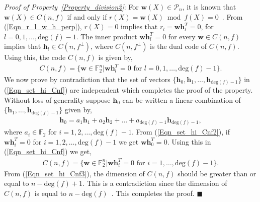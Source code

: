 \documentclass[10pt,journal]{IEEEtran}
\def \deg{{\mathrm{deg}}}
\begin{document}
\textit{Proof of Property~\ref{Property_division2}}:
%  
% 
For $\mathbf{w}(X) \in \mathcal{P}_n$, it is known that $\mathbf{w}(X) \in C(n,f)$ if and only if 
$r(X) = \mathbf{w}(X) \bmod f(X) = 0$~\cite{LinCostello2004}.
% 
From (\ref{Eqn_r_l_w_h_perp}), $r(X) = 0$ implies that $r_l = \mathbf{w}\mathbf{h}_l^T = 0$, for $l = 0,1,\ldots,\deg(f)-1$.
% 
The inner product $\mathbf{w}\mathbf{h}_l^T = 0$ for every $\mathbf{w} \in C(n,f)$ implies that
$\mathbf{h}_l \in C(n,f^{\perp})$, where $C(n,f^{\perp})$ is the dual code of $C(n,f)$.
% 
Using this, the code $C(n,f)$ is given by,
% 
\begin{align}
%  
C(n,f) = \Big\{ \mathbf{w} \in \mathbb{F}_2^n \Big| \mathbf{w}\mathbf{h}_l^T=0 \mbox{ for } l = 0,1,\ldots,\deg(f)-1 \Big\}.
\label{Eqn_set_hi_Cnf}
% 
\end{align}
% 
% 
We now prove by contradiction that the set of vectors $\{ \mathbf{h}_0, \mathbf{h}_1, \ldots, \mathbf{h}_{\deg(f)-1} \}$ in (\ref{Eqn_set_hi_Cnf})
are independent which completes the proof of the property. 
Without loss of generality suppose $\mathbf{h}_0$ can be written a linear combination of  $\{ \mathbf{h}_1, \ldots, \mathbf{h}_{\deg(f)-1} \}$ 
given by,
% 
\begin{align}
%  
\mathbf{h}_0 = a_1 \mathbf{h}_1 + a_2 \mathbf{h}_2 + \ldots + a_{\deg(f)-1} \mathbf{h}_{\deg(f)-1},
\label{Eqn_set_hi_Cnf2}
% 
\end{align}
% 
where $a_i \in \mathbb{F}_2$ for $i = 1,2,\ldots,{\deg(f)-1}$.
From (\ref{Eqn_set_hi_Cnf2}), if $\mathbf{w}\mathbf{h}_i^T = 0$ for $i = 1,2,\ldots,{\deg(f)-1}$ 
we get $\mathbf{w}\mathbf{h}_0^T = 0$. 
Using this in (\ref{Eqn_set_hi_Cnf}) we get,
% 
\begin{align}
%  
C(n,f) = \Big\{ \mathbf{w} \in \mathbb{F}_2^n \Big| \mathbf{w}\mathbf{h}_i^T=0 \mbox{ for } i = 1,\ldots,\deg(f)-1 \Big\}.
\label{Eqn_set_hi_Cnf3}
% 
\end{align}
% 
From (\ref{Eqn_set_hi_Cnf3}), the dimension of $C(n,f)$ should be greater than or equal to $n-\deg(f)+1$.
This is a contradiction since the dimension of $C(n,f)$ is equal to $n-\deg(f)$~\cite{LinCostello2004}.
This completes the proof.
% 
\hfill $\blacksquare$
% 
\end{document}
